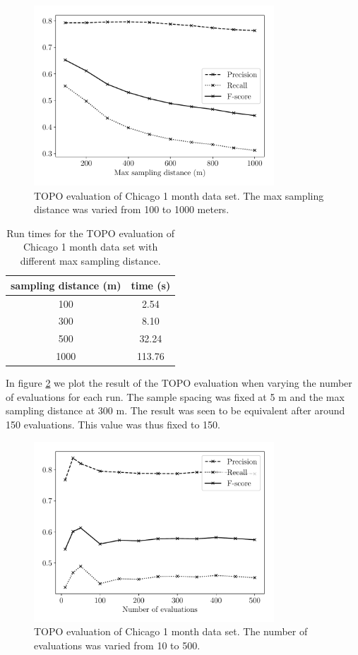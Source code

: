 \begin{figure}[H]
    \centering
    \includegraphics[width=9cm]{Figures/Experimental_Setup/test_sample_dist.pdf}
    \caption{TOPO evaluation of Chicago 1 month data set. The max sampling distance was varied from 100 to 1000 meters.}
    \label{fig:experiments/samp_dist}
\end{figure}

\begin{table}[H]
\centering
\caption{Run times for the TOPO evaluation of Chicago 1 month data set with different max sampling distance.}
\label{tab:experiments/samp_dist}
\begin{tabular}{cc}
sampling distance (m) & time (s) \\ \hline
100 & 2.54 \\
300 & 8.10 \\
500 & 32.24 \\
1000 & 113.76 \\ \hline
\end{tabular}
\end{table}

In figure \ref{fig:experiments/num_evals} we plot the result of the TOPO evaluation when varying the number of evaluations for each run. The sample spacing was fixed at 5 m and the max sampling distance at 300 m. The result was seen to be equivalent after around 150 evaluations. This value was thus fixed to 150.
\begin{figure}[H]
    \centering
    \includegraphics[width=9cm]{Figures/Experimental_Setup/test_num_evals.pdf}
    \caption{TOPO evaluation of Chicago 1 month data set. The number of evaluations was varied from 10 to 500.}
    \label{fig:experiments/num_evals}
\end{figure}

